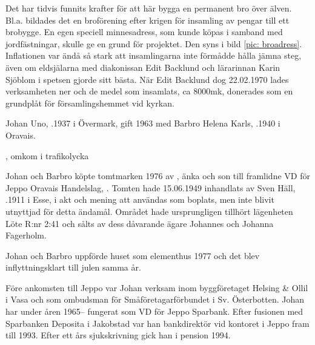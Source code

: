 Det har tidvis funnits krafter för att här bygga en permanent bro över älven. Bl.a. bildades det en broförening efter krigen för insamling av pengar till ett brobygge. En egen speciell minnesadress, som kunde köpas i samband med jordfästningar, skulle ge en grund för projektet. Den syns i bild \ref{pic: broadress}. Inflationen var ändå så stark att insamlingarna inte förmådde hålla jämna steg, även om eldsjälarna med diakonissan Edit Backlund och lärarinnan Karin Sjöblom i spetsen gjorde sitt bästa. När Edit Backlund dog 22.02.1970 lades verksamheten ner och de medel som insamlats, ca 8000mk, donerades som en grundplåt för församlingshemmet vid kyrkan.






Johan Uno, .1937 i Övermark, gift 1963 med Barbro Helena Karls, .1940 i Oravais.
\begin{jhchildren}
  \item {}
  \item {}, omkom i trafikolycka
  \item {}
\end{jhchildren}

Johan och Barbro köpte tomtmarken 1976 av , änka och son till framlidne VD för Jeppo Oravais Handelslag, . Tomten hade 15.06.1949 inhandlats av Sven Häll, .1911 i Esse, i akt och mening att användas som boplats, men inte blivit utnyttjad för detta ändamål. Området hade ursprungligen tillhört lägenheten Löte R:nr 2:41 och sålts av dess dåvarande ägare Johannes och Johanna Fagerholm.

Johan och Barbro uppförde huset som elementhus 1977 och det blev inflyttningsklart till julen samma år.

Före ankomsten till Jeppo var Johan verksam inom byggföretaget Helsing \& Ollil i Vasa och som ombudsman för Småföretagarförbundet i Sv. Österbotten. Johan har under åren 1965-- fungerat som VD för Jeppo Sparbank. Efter fusionen med Sparbanken Deposita i Jakobstad var han bankdirektör vid kontoret i Jeppo fram till 1993. Efter ett års sjukskrivning gick han i pension 1994.


